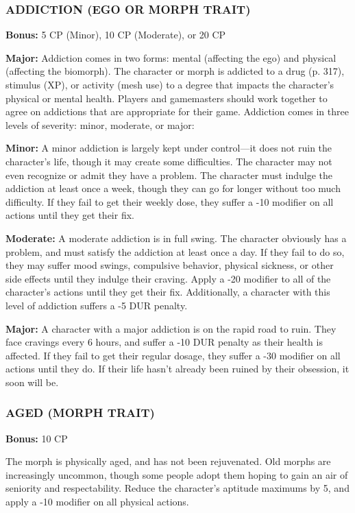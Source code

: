 \subsubsection{ADDICTION (EGO OR MORPH TRAIT)}
\textbf{Bonus:} 5 CP (Minor), 10 CP (Moderate), or 20 CP

\textbf{Major:} Addiction comes in two forms: mental (affecting the ego) and
physical (affecting the biomorph). The character or morph is addicted to a drug
(p. 317), stimulus (XP), or activity (mesh use) to a degree that impacts the
character’s physical or mental health.  Players and gamemasters should work
together to agree on addictions that are appropriate for their game. Addiction
comes in three levels of severity: minor, moderate, or major:

\textbf{Minor:} A minor addiction is largely kept under control—it does not
ruin the character’s life, though it may create some difficulties. The
character may not even recognize or admit they have a problem. The character
must indulge the addiction at least once a week, though they can go for longer
without too much difficulty. If they fail to get their weekly dose, they suffer
a -10 modifier on all actions until they get their fix.

\textbf{Moderate:} A moderate addiction is in full swing.  The character
obviously has a problem, and must satisfy the addiction at least once a day. If
they fail to do so, they may suffer mood swings, compulsive behavior, physical
sickness, or other side effects until they indulge their craving. Apply a -20
modifier to all of the character’s actions until they get their fix.
Additionally, a character with this level of addiction suffers a -5 DUR
penalty.

\textbf{Major:} A character with a major addiction is on the rapid road to
ruin. They face cravings every 6 hours, and suffer a -10 DUR penalty as their
health is affected. If they fail to get their regular dosage, they suffer a -30
modifier on all actions until they do. If their life hasn’t already been ruined
by their obsession, it soon will be.

\subsubsection{AGED (MORPH TRAIT)}
\textbf{Bonus:} 10 CP

The morph is physically aged, and has not been rejuvenated. Old morphs are
increasingly uncommon, though some people adopt them hoping to gain an air of
seniority and respectability. Reduce the character’s aptitude maximums by 5,
and apply a -10 modifier on all physical actions.

